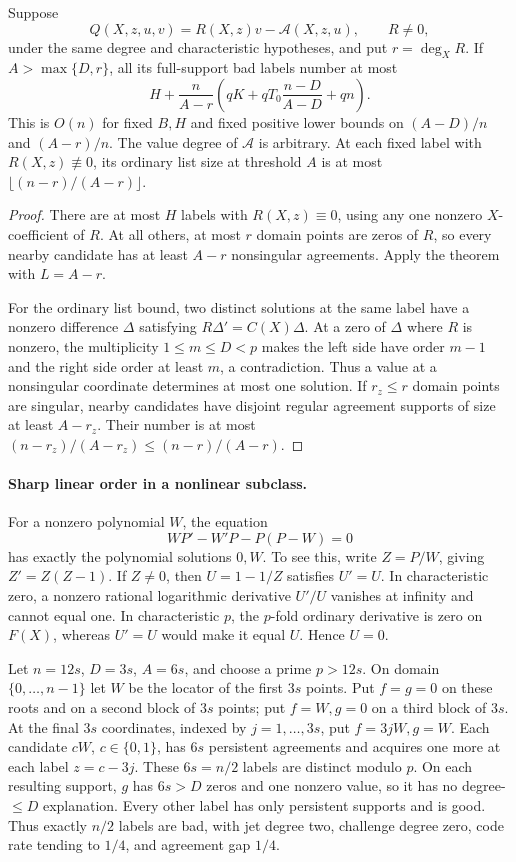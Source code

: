 \begin{corollary}
\label{cor:value-independent-separant}
Suppose
\[
 Q(X,z,u,v)=R(X,z)v-\mathcal A(X,z,u),\qquad R\ne0,
\]
under the same degree and characteristic hypotheses, and put
$r=\deg_XR$. If $A>\max\{D,r\}$, all its full-support bad labels
number at most
\begin{equation}
 H+\frac n{A-r}\left(qK+qT_0\frac{n-D}{A-D}+qn\right).
 \label{eq:quasilinear-linear-mca}
\end{equation}
This is $O(n)$ for fixed $B,H$ and fixed positive lower bounds on
$(A-D)/n$ and $(A-r)/n$. The value degree of $\mathcal A$ is arbitrary.
At each fixed label with $R(X,z)\not\equiv0$, its ordinary list size
at threshold $A$ is at most $\lfloor(n-r)/(A-r)\rfloor$.
\end{corollary}
\begin{proof}
There are at most $H$ labels with $R(X,z)\equiv0$, using any one
nonzero $X$-coefficient of $R$. At all others, at most $r$ domain
points are zeros of $R$, so every nearby candidate has at least
$A-r$ nonsingular agreements. Apply the theorem with $L=A-r$.

For the ordinary list bound, two distinct solutions at the same
label have a nonzero difference $\Delta$ satisfying
$R\Delta'=C(X)\Delta$. At a zero of $\Delta$ where $R$ is nonzero,
the multiplicity $1\le m\le D<p$ makes the left side have order
$m-1$ and the right side order at least $m$, a contradiction.
Thus a value at a nonsingular coordinate determines at most one
solution. If $r_z\le r$ domain points are singular, nearby candidates
have disjoint regular agreement supports of size at least $A-r_z$.
Their number is at most $(n-r_z)/(A-r_z)\le(n-r)/(A-r)$.
\end{proof}

\paragraph{Sharp linear order in a nonlinear subclass.}
For a nonzero polynomial $W$, the equation
\[
 WP'-W'P-P(P-W)=0
\]
has exactly the polynomial solutions $0,W$. To see this, write
$Z=P/W$, giving $Z'=Z(Z-1)$. If $Z\ne0$, then $U=1-1/Z$ satisfies
$U'=U$. In characteristic zero, a nonzero rational logarithmic
derivative $U'/U$ vanishes at infinity and cannot equal one. In
characteristic $p$, the $p$-fold ordinary derivative is zero on
$F(X)$, whereas $U'=U$ would make it equal $U$. Hence $U=0$.

Let $n=12s$, $D=3s$, $A=6s$, and choose a prime $p>12s$. On
domain $\{0,\ldots,n-1\}$ let $W$ be the locator of the first $3s$
points. Put $f=g=0$ on these roots and on a second block of $3s$
points; put $f=W,g=0$ on a third block of $3s$. At the final $3s$
coordinates, indexed by $j=1,\ldots,3s$, put $f=3jW,g=W$.
Each candidate $cW$, $c\in\{0,1\}$, has $6s$ persistent agreements
and acquires one more at each label $z=c-3j$. These $6s=n/2$ labels
are distinct modulo $p$. On each resulting support, $g$ has $6s>D$
zeros and one nonzero value, so it has no degree-$\le D$ explanation.
Every other label has only persistent supports and is good. Thus
exactly $n/2$ labels are bad, with jet degree two, challenge degree
zero, code rate tending to $1/4$, and agreement gap $1/4$.

